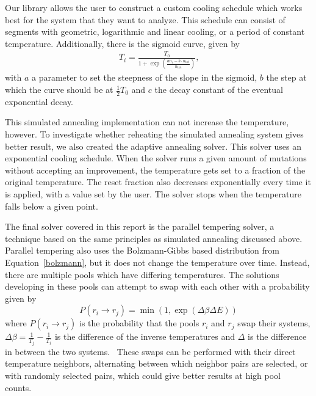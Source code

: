 Our library allows the user to construct a custom cooling schedule which works best for the system that they want to analyze. This schedule can consist of segments with geometric, logarithmic and linear cooling, or a period of constant temperature. Additionally, there is the sigmoid curve, given by \begin{align}
  T_i = \frac{T_0}{1 + \exp\left( \frac{a n_i - b \cdot n_\text{tot}}{n_\text{tot}} \right)}\text{,}
\end{align} with \(a\) a parameter to set the steepness of the slope in the sigmoid, \(b\) the step at which the curve should be at \(\frac{1}{2} T_0\) and \(c\) the decay constant of the eventual exponential decay. 

This simulated annealing implementation can not increase the temperature, however. To investigate whether reheating the simulated annealing system gives better result, we also created the adaptive annealing solver. This solver uses an exponential cooling schedule. When the solver runs a given amount of mutations without accepting an improvement, the temperature gets set to a fraction of the original temperature. The reset fraction also decreases exponentially every time it is applied, with a value set by the user. The solver stops when the temperature falls below a given point.

The final solver covered in this report is the parallel tempering solver, a technique based on the same principles as simulated annealing discussed above.~\cite{parallelTempering1, parallelTempering2,parallelTempering3} Parallel tempering also uses the Bolzmann-Gibbs based distribution from Equation~\ref{bolzmann}, but it does not change the temperature over time. Instead, there are multiple pools which have differing temperatures. The solutions developing in these pools can attempt to swap with each other with a probability given by
\begin{equation}
  P(r_i \rightarrow r_j) = \min(1, \exp(\Delta \beta \Delta E))
\end{equation}
where \(P(r_i \rightarrow r_j)\) is the probability that the pools \(r_i\) and \(r_j\) swap their systems, \(\Delta \beta = \frac{1}{T_j} - \frac{1}{T_i}\) is the difference of the inverse temperatures and \(\Delta\) is the difference in \loge{} between the two systems.~\cite{parallelTemperingSwapprob} These swaps can be performed with their direct temperature neighbors, alternating between which neighbor pairs are selected, or with randomly selected pairs, which could give better results at high pool counts.~\cite{parallelTemperingPairs}

